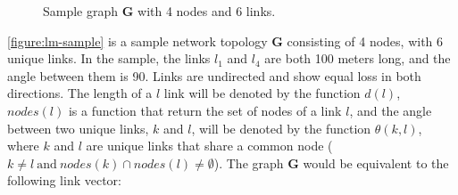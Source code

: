%
%
%

\begin{figure}[H]
    \centering
    \caption{Sample graph \textbf{G} with 4 nodes and 6 links.}
    \label{figure:lm-sample}
\end{figure}

\autoref{figure:lm-sample} is a sample network topology \textbf{G} consisting of 4 nodes, with 6 unique links. In the sample, the links $l_1$ and $l_4$ are both 100 meters long, and the angle between them is 90\textdegree. Links are undirected and show equal loss in both directions. The length of a $l$ link will be denoted by the function $d(l)$, $nodes(l)$ is a function that return the set of nodes of a link $l$, and the angle between two unique links, $k$ and $l$, will be denoted by the function $\theta(k,l)$, where $k$ and $l$ are unique links that share a common node ($ k \neq l \ \text{and} \  nodes(k) \cap nodes(l) \neq \emptyset $). \smallbreak
The graph \textbf{G} would be equivalent to the following link vector:

